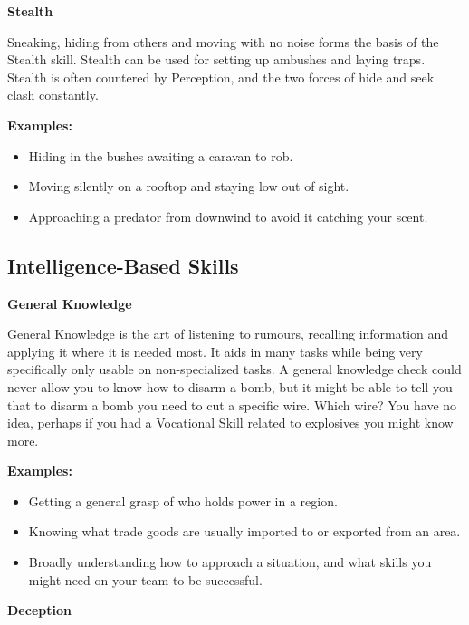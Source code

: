\textbf{Stealth}

Sneaking, hiding from others and moving with no noise forms the basis of the Stealth skill. Stealth can be used for setting up ambushes and laying traps. Stealth is often countered by Perception, and the two forces of hide and seek clash constantly.

\begin{displayquote}
    \textbf{Examples:}
    \begin{itemize}
        \item Hiding in the bushes awaiting a caravan to rob.
        \item Moving silently on a rooftop and staying low out of sight.
        \item Approaching a predator from downwind to avoid it catching your scent.
    \end{itemize}
\end{displayquote}

\subsection{Intelligence-Based Skills} \label{subsec:intelligence-based_skills}

\textbf{General Knowledge}

General Knowledge is the art of listening to rumours, recalling information and applying it where it is needed most. It aids in many tasks while being very specifically only usable on non-specialized tasks. A general knowledge check could never allow you to know how to disarm a bomb, but it might be able to tell you that to disarm a bomb you need to cut a specific wire. Which wire? You have no idea, perhaps if you had a Vocational Skill related to explosives you might know more.

\begin{displayquote}
    \textbf{Examples:}
    \begin{itemize}
        \item Getting a general grasp of who holds power in a region.
        \item Knowing what trade goods are usually imported to or exported from an area.
        \item Broadly understanding how to approach a situation, and what skills you might need on your team to be successful.
    \end{itemize}
\end{displayquote}

\textbf{Deception}

